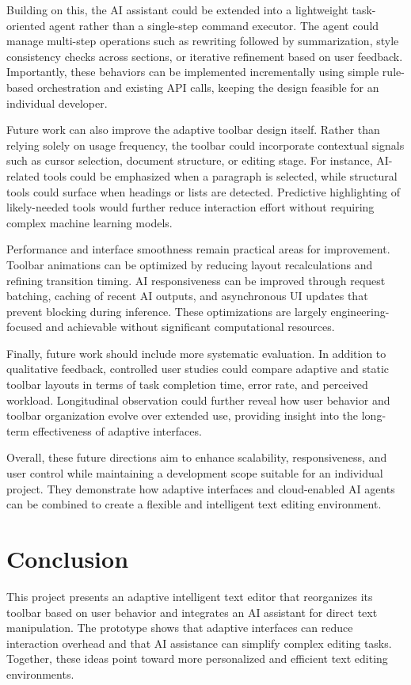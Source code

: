 \documentclass[sigconf]{acmart}
\begin{document}
Building on this, the AI assistant could be extended into a lightweight task-oriented agent rather than a single-step command executor. The agent could manage multi-step operations such as rewriting followed by summarization, style consistency checks across sections, or iterative refinement based on user feedback. Importantly, these behaviors can be implemented incrementally using simple rule-based orchestration and existing API calls, keeping the design feasible for an individual developer.

Future work can also improve the adaptive toolbar design itself. Rather than relying solely on usage frequency, the toolbar could incorporate contextual signals such as cursor selection, document structure, or editing stage. For instance, AI-related tools could be emphasized when a paragraph is selected, while structural tools could surface when headings or lists are detected. Predictive highlighting of likely-needed tools would further reduce interaction effort without requiring complex machine learning models.

Performance and interface smoothness remain practical areas for improvement. Toolbar animations can be optimized by reducing layout recalculations and refining transition timing. AI responsiveness can be improved through request batching, caching of recent AI outputs, and asynchronous UI updates that prevent blocking during inference. These optimizations are largely engineering-focused and achievable without significant computational resources.

Finally, future work should include more systematic evaluation. In addition to qualitative feedback, controlled user studies could compare adaptive and static toolbar layouts in terms of task completion time, error rate, and perceived workload. Longitudinal observation could further reveal how user behavior and toolbar organization evolve over extended use, providing insight into the long-term effectiveness of adaptive interfaces.

Overall, these future directions aim to enhance scalability, responsiveness, and user control while maintaining a development scope suitable for an individual project. They demonstrate how adaptive interfaces and cloud-enabled AI agents can be combined to create a flexible and intelligent text editing environment.


\section{Conclusion}
This project presents an adaptive intelligent text editor that reorganizes its toolbar based on user behavior and integrates an AI assistant for direct text manipulation. The prototype shows that adaptive interfaces can reduce interaction overhead and that AI assistance can simplify complex editing tasks. Together, these ideas point toward more personalized and efficient text editing environments.




\end{document}
